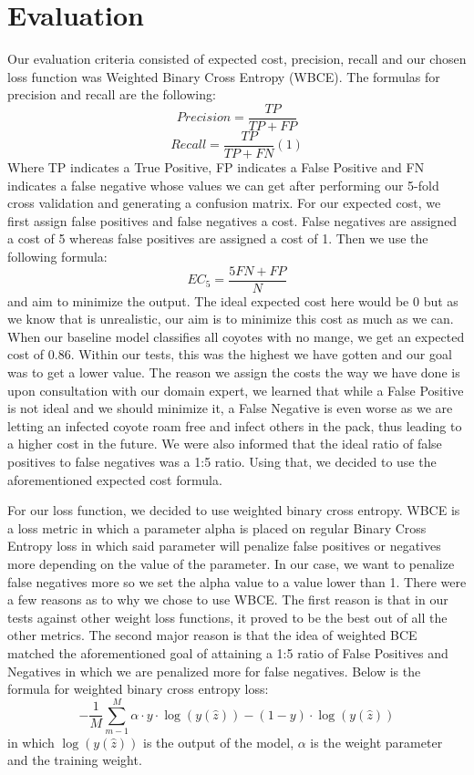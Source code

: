 \documentclass{article}
\begin{document}
\section{Evaluation}
Our evaluation criteria consisted of expected cost, precision, recall and our chosen loss function was Weighted Binary Cross Entropy (WBCE). The formulas for precision and recall are the following:
\[Precision = \frac{TP}{TP+FP}\]
\[Recall = \frac{TP}{TP+FN}	    (1)\]     %
Where TP indicates a True Positive, FP indicates a False Positive and FN indicates a false negative whose values we can get after performing our 5-fold cross validation and generating a confusion matrix. For our expected cost, we first assign false positives and false negatives a cost. False negatives are assigned a cost of 5 whereas false positives are assigned a cost of 1. Then we use the following formula: 
\[EC_5 = \frac{5FN + FP}{N}\]
and aim to minimize the output. The ideal expected cost here would be 0 but as we know that is unrealistic, our aim is to minimize this cost as much as we can. When our baseline model classifies all coyotes with no mange, we get an expected cost of 0.86. Within our tests, this was the highest we have gotten and our goal was to get a lower value.  The reason we assign the costs the way we have done is upon consultation with our domain expert, we learned that while a False Positive is not ideal and we should minimize it, a False Negative is even worse as we are letting an infected coyote roam free and infect others in the pack, thus leading to a higher cost in the future. We were also informed that the ideal ratio of false positives to false negatives was a 1:5 ratio. Using that, we decided to use the aforementioned expected cost formula.

For our loss function, we decided to use weighted binary cross entropy. WBCE is a loss metric in which a parameter alpha is placed on  regular Binary Cross Entropy loss in which said parameter will penalize false positives or negatives more depending on the value of the parameter. In our case, we want to penalize false negatives more so we set the alpha value to a value lower than 1. There were a few reasons as to why we chose to use WBCE. The first reason is that in our tests against other weight loss functions, it proved to be the best out of all the other metrics. The second major reason is that the idea of weighted BCE matched the aforementioned goal of attaining a 1:5 ratio of False Positives and Negatives in which we are penalized more for false negatives. Below is the formula for weighted binary cross entropy loss:
\[
-\frac{1}{M}\sum_{m-1}^{M}\alpha \cdot y \cdot \log(y(\hat{z}))-(1-y)\cdot\log(y(\hat{z})) 
\]
in which $\log(y(\hat{z}))$ is the output of the model, $\alpha$ is the weight parameter and the training weight.
\end{document}
